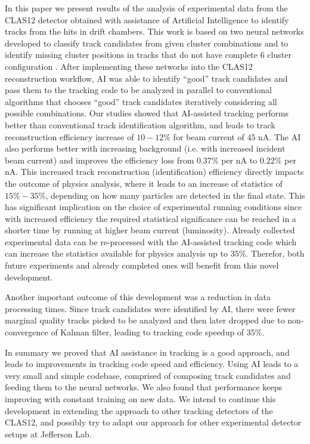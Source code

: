 In this paper we present results of the analysis of experimental data from the CLAS12 detector obtained with assistance of Artificial Intelligence
to identify tracks from the hits in drift chambers. This work is based on two neural networks developed to classify track candidates from
given cluster combinations \cite{Gavalian:2020oxg} and to identify missing cluster positions in tracks that do not have complete 6 cluster configuration \cite{Gavalian:2020xmc}. After implementing these networks into the CLAS12 reconstruction workflow, AI was able to identify ``good'' track candidates 
and pass them to the tracking code to be analyzed in parallel to conventional algorithms that chooses ``good'' track candidates iteratively considering all possible combinations. 
Our studies showed that AI-assisted tracking performs better than conventional track identification algorithm, and leads to track reconstruction efficiency increase of $10-12\%$ for beam current of 45 nA. The AI also performs better with increasing background (i.e. with increased incident beam current) and improves the efficiency loss from $0.37\%$ per nA to $0.22\%$ per nA.
This increased track reconstruction (identification) efficiency directly impacts the outcome of physics analysis, where it leads to an increase of statistics of 
$15\%-35\%$, depending on how many particles are detected in the final state. This has significant implication on  the choice of experimental running conditions since with increased efficiency the required statistical significance can be reached in a shorter time by running at higher beam current (luminosity). Already collected experimental data can be re-processed with the AI-assisted tracking
code which can increase the statistics available for physics analysis up to $35\%$. Therefor, both future experiments and already completed ones will benefit 
from this novel development.

Another important outcome of this development was a reduction in data processing times. Since track candidates were identified by AI, there were fewer marginal quality tracks picked to be analyzed and then later dropped due to non-convergence of Kalman filter, leading to tracking code speedup  of $35\%$.

In summary we proved that AI assistance in tracking is a good approach, and leads to improvements in tracking code speed and efficiency. 
Using AI leads to a very small and simple codebase, comprised of composing track candidates and feeding them to the neural networks. 
We also found that performance keeps improving with constant training on new data. We intend to continue this development in extending 
the approach to other tracking detectors of the CLAS12, and possibly try to adapt  our approach for other experimental detector setups at Jefferson Lab.

